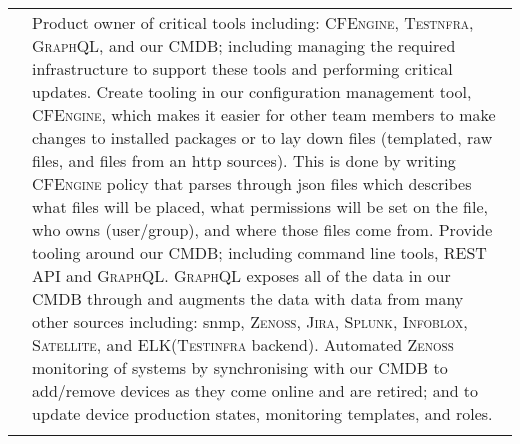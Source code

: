 \documentclass[letterpaper,10pt]{article}
\begin{document}
\begin{tabular}{R|p{6.2in}}
	                               & \footnotesize Product owner of critical tools including: \textsc{CFEngine, Testnfra, GraphQL}, and our CMDB; including managing the required infrastructure to support these tools and performing critical updates. Create tooling in our configuration management tool, \textsc{CFEngine}, which makes it easier for other team members to make changes to installed packages or to lay down files (templated, raw files, and files from an http sources). This is done by writing \textsc{CFEngine} policy that parses through json files which describes what files will be placed, what permissions will be set on the file, who owns (user/group), and where those files come from. Provide tooling around our CMDB; including command line tools, REST API and \textsc{GraphQL}. \textsc{GraphQL} exposes all of the data in our CMDB through and augments the data with data from many other sources including: snmp, \textsc{Zenoss, Jira, Splunk, Infoblox, Satellite}, and \textsc{ELK}(\textsc{Testinfra} backend). Automated \textsc{Zenoss} monitoring of systems by synchronising with our CMDB to add/remove devices as they come online and are retired; and to update device production states, monitoring templates, and roles. \\
	                                                                                                                                                                                                                                                                                                                                                                                                                                                                                                                                                                                                                                                                                                                                                                                                                                                                                                                                                                                                                                                                                                                                                                                                                                                               \\



\end{tabular}
\end{document}
